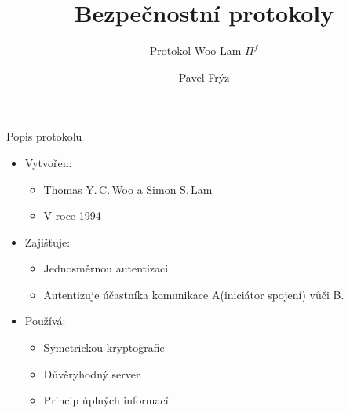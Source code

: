 \documentclass[fyma2,final]{prosper}
\begin{document}
\title{Bezpečnostní protokoly}
\subtitle{Protokol Woo Lam $\Pi^f$}
\author{Pavel Frýz}
\displayVersion

\maketitle

\begin{slide}{Popis protokolu}
\begin{itemize}
 \item Vytvořen:
   \begin{itemize}
   \item Thomas Y.\,C.\,Woo a Simon S.\,Lam
   \item V roce 1994
   \end{itemize}
 \item Zajišťuje:
   \begin{itemize}
   \item Jednosměrnou autentizaci
   \item Autentizuje účastníka komunikace A(iniciátor spojení) vůči B.
   \end{itemize}
 \item Používá:
   \begin{itemize}
   \item Symetrickou kryptografie
   \item Důvěryhodný server
   \item Princip úplných informací
   \end{itemize}
\end{itemize}
\end{slide}
\end{document}
